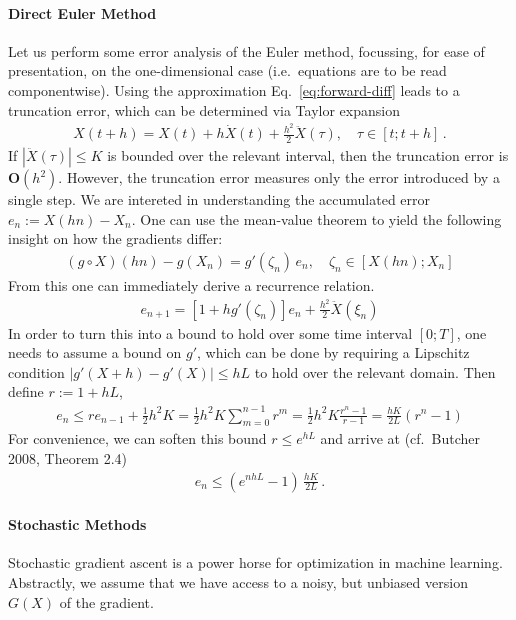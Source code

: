 \documentclass{article}
\newcommand{\bigO}{{\mathbf O}}
\begin{document}
\paragraph*{Direct Euler Method} 
Let us perform some error analysis of the Euler method, focussing, for ease of presentation, on the one-dimensional case (i.e.~equations are to be read componentwise). Using the approximation Eq.~\eqref{eq:forward-diff} leads to a truncation error, which can be determined via Taylor expansion
\begin{align}
X(t+h) = X(t) + h \dot X(t) + \frac{h^2}{2} \ddot X(\tau), \quad \tau \in [t; t+h]\,.
\end{align}
If $|\ddot X(\tau)| \le K$ is bounded over the relevant interval, then the truncation error is $\bigO(h^2)$. However, the truncation error measures only the error introduced by a single step. We are intereted in understanding the accumulated error $e_{n} := X(hn) - X_n$. One can use the mean-value theorem to yield the following insight on how the gradients differ:
\begin{align}
(g \circ X)(hn) - g(X_n) =  g'(\zeta_n) \, e_n  , \quad \zeta_n \in [X(hn) ;X_n] 
\end{align}
From this one can immediately derive a recurrence relation.
\begin{align}
e_{n+1} = \left[ 1 + h  g'(\zeta_n) \right]   e_n  + \frac{h^2}{2} \ddot X(\xi_n)
\end{align}
In order to turn this into a bound to hold over some time interval $[0; T]$, one needs to assume a bound on $g'$, which can be done by requiring a Lipschitz condition $|g'(X+h) - g'(X)| \le hL$ to hold over the relevant domain. Then define $r := 1+hL$, 
\begin{align}
e_{n} \le r e_{n-1} + \tfrac12 h^2 K  = \tfrac 12  h^2 K \sum_{m=0}^{n-1} r^m = \tfrac 12  h^2 K \frac{r^n-1}{r-1} 
=\frac {hK}{2L} (r^{n}-1)
\end{align}
For convenience, we can soften this bound $r\le e^{hL}$ and arrive at  (cf.~Butcher 2008, Theorem 2.4) 
\begin{align}
e_{n}  \le (e^{nhL}-1)\, \frac {hK}{2L} \,.
\end{align}

\paragraph*{Stochastic Methods} Stochastic gradient ascent is a power horse for optimization in machine learning. Abstractly, we assume that we have access to a noisy, but unbiased version $G(X)$ of the gradient. 
\end{document}
